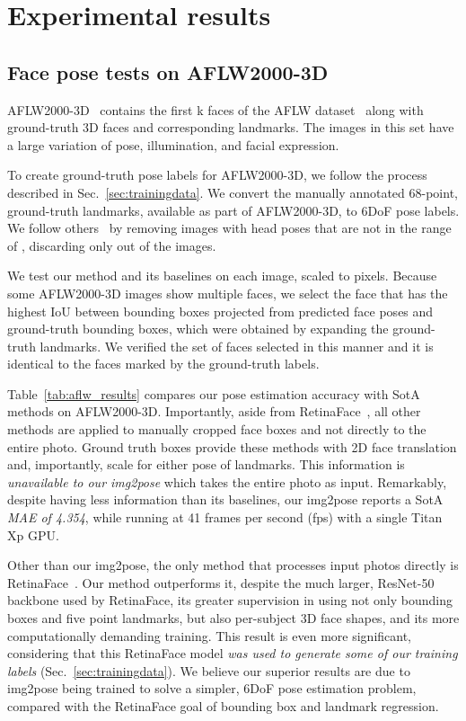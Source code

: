 \documentclass[final]{cvpr}
\newcommand{\minisection}[1]{\vspace{1mm}\noindent{\textbf{#1}.}}
\begin{document}
\section{Experimental results}
\subsection{Face pose tests on AFLW2000-3D}\label{sec:AFLW2000}
AFLW2000-3D~\cite{3ddfa} contains the first k faces of the AFLW dataset~\cite{aflw} along with ground-truth 3D faces and corresponding  landmarks. The images in this set have a large variation of pose, illumination, and facial expression. 

To create ground-truth pose labels for AFLW2000-3D, we follow the process described in Sec.~\ref{sec:trainingdata}. We convert the manually annotated 68-point, ground-truth landmarks, available as part of AFLW2000-3D, to 6DoF pose labels. We follow others~\cite{hopenet, fsanet} by removing images with head poses that are not in the range of  , discarding only  out of the  images. 


We test our method and its baselines on each image, scaled to  pixels. Because some AFLW2000-3D images show multiple faces, we select the face that has the highest IoU between bounding boxes projected from predicted face poses and ground-truth bounding boxes, which were obtained by expanding the ground-truth landmarks. We verified the set of faces selected in this manner and it is identical to the faces marked by the ground-truth labels. 



\minisection{AFLW2000-3D face pose results} Table~\ref{tab:aflw_results} compares our pose estimation accuracy with SotA methods on AFLW2000-3D. Importantly, aside from RetinaFace~\cite{retinaface}, all other methods are applied to manually cropped face boxes and not directly to the entire photo. Ground truth boxes provide these methods with 2D face translation and, importantly, scale for either pose of landmarks. This information is {\em unavailable to our img2pose} which takes the entire photo as input. Remarkably, despite having less information than its baselines, our img2pose reports a SotA {\em MAE of 4.354}, while running at 41 frames per second (fps) with a single Titan Xp GPU.


Other than our img2pose, the only method that processes input photos directly is RetinaFace~\cite{retinaface}. Our method outperforms it, despite the much larger, ResNet-50 backbone used by RetinaFace, its greater supervision in using not only bounding boxes and five point landmarks, but also per-subject 3D face shapes, and its more computationally demanding training. This result is even more significant, considering that this RetinaFace model {\em was used to generate some of our training labels} (Sec.~\ref{sec:trainingdata}). We believe our superior results are due to img2pose being trained to solve a simpler, 6DoF pose estimation problem, compared with the RetinaFace goal of bounding box and landmark regression. 
\end{document}
